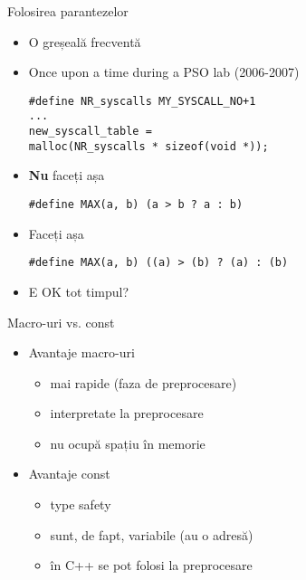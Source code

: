 \documentclass{beamer}
\begin{document}
\begin{frame}{Folosirea parantezelor}
	\begin{itemize}
		\item O greșeală frecventă
		\item Once upon a time during a PSO lab (2006-2007)
			\begin{beamerboxesrounded}[lower=block body,shadow=true]{}
				\texttt{\#define NR\_syscalls     MY\_SYSCALL\_NO+1 \\
			... \\
				new\_syscall\_table = \\
\hlstd{}\hlstd{\ \ \ \ \ \ \ \ }\hlstd{}malloc(NR\_syscalls * sizeof(void *));
		}
			\end{beamerboxesrounded}
		\item \textbf{Nu} faceți așa
			\begin{beamerboxesrounded}[lower=block body,shadow=true]{}
				\texttt{\#define MAX(a, b)   (a > b ? a : b)}
			\end{beamerboxesrounded}
		\item Faceți așa
			\begin{beamerboxesrounded}[lower=block body,shadow=true]{}
				\texttt{\#define MAX(a, b)   ((a) > (b) ? (a) : (b)}
			\end{beamerboxesrounded}
		\item E OK tot timpul?
	\end{itemize}
\end{frame}

\begin{frame}{Macro-uri vs. const}
	\begin{itemize}
		\item Avantaje macro-uri
			\begin{itemize}
				\item mai rapide (faza de preprocesare)
				\item interpretate la preprocesare
				\item nu ocupă spațiu în memorie
			\end{itemize}
		\item Avantaje const
			\begin{itemize}
				\item type safety
				\item sunt, de fapt, variabile (au o adresă)
				\item în C++ se pot folosi la preprocesare
			\end{itemize}
	\end{itemize}
\end{frame}
\end{document}
